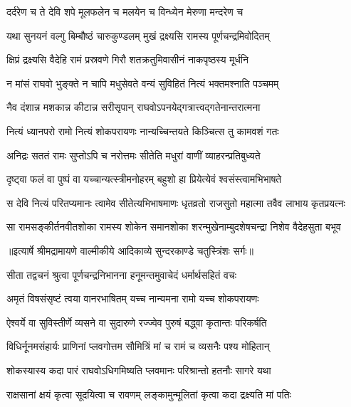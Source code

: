 \twolineshloka
{दर्दरेण च ते देवि शपे मूलफलेन च}
{मलयेन च विन्ध्येन मेरुणा मन्दरेण च} %

\twolineshloka
{यथा सुनयनं वल्गु बिम्बौष्ठं चारुकुण्डलम्}
{मुखं द्रक्ष्यसि रामस्य पूर्णचन्द्रमिवोदितम्} %

\twolineshloka
{क्षिप्रं द्रक्ष्यसि वैदेहि रामं प्रस्रवणे गिरौ}
{शतक्रतुमिवासीनं नाकपृष्ठस्य मूर्धनि} %

\twolineshloka
{न मांसं राघवो भुङ्क्ते न चापि मधुसेवते}
{वन्यं सुविहितं नित्यं भक्तमश्नाति पञ्चमम्} %

\twolineshloka
{नैव दंशान्न मशकान्न कीटान्न सरीसृपान्}
{राघवोऽपनयेद्गत्रात्त्वद्गतेनान्तरात्मना} %

\twolineshloka
{नित्यं ध्यानपरो रामो नित्यं शोकपरायणः}
{नान्यच्चिन्तयते किञ्चित्स तु कामवशं गतः} %

\twolineshloka
{अनिद्रः सततं रामः सुप्तोऽपि च नरोत्तमः}
{सीतेति मधुरां वाणीं व्याहरन्प्रतिबुध्यते} %

\twolineshloka
{दृष्ट्वा फलं वा पुष्पं वा यच्चान्यत्स्त्रीमनोहरम्}
{बहुशो हा प्रियेत्येवं श्वसंस्त्वामभिभाषते} %

\fourlineindentedshloka
{स देवि नित्यं परितप्यमानः}
{त्वामेव सीतेत्यभिभाषमाणः}
{धृतव्रतो राजसुतो महात्मा}
{तवैव लाभाय कृतप्रयत्नः} %

\fourlineindentedshloka
{सा रामसङ्कीर्तनवीतशोका}
{रामस्य शोकेन समानशोका}
{शरन्मुखेनाम्बुदशेषचन्द्रा}
{निशेव वैदेहसुता बभूव} %


{॥इत्यार्षे श्रीमद्रामायणे वाल्मीकीये आदिकाव्ये सुन्दरकाण्डे चतुस्त्रिंशः सर्गः॥}


\twolineshloka
{सीता तद्वचनं श्रुत्वा पूर्णचन्द्रनिभानना}
{हनूमन्तमुवाचेदं धर्मार्थसहितं वचः} %

\twolineshloka
{अमृतं विषसंसृष्टं त्वया वानरभाषितम्}
{यच्च नान्यमना रामो यच्च शोकपरायणः} %

\twolineshloka
{ऐश्वर्ये वा सुविस्तीर्णे व्यसने वा सुदारुणे}
{रज्ज्वेव पुरुषं बद्ध्वा कृतान्तः परिकर्षति} %

\twolineshloka
{विधिर्नूनमसंहार्यः प्राणिनां प्लवगोत्तम}
{सौमित्रिं मां च रामं च व्यसनैः पश्य मोहितान्} %

\twolineshloka
{शोकस्यास्य कदा पारं राघवोऽधिगमिष्यति}
{प्लवमानः परिश्रान्तो हतनौः सागरे यथा} %

\twolineshloka
{राक्षसानां क्षयं कृत्वा सूदयित्वा च रावणम्}
{लङ्कामुन्मूलितां कृत्वा कदा द्रक्ष्यति मां पतिः} %

